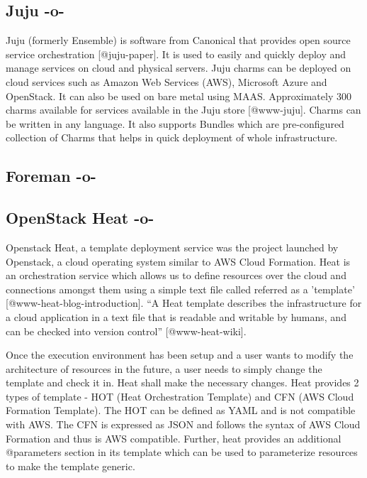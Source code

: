 \subsection{Juju -o-}

Juju (formerly Ensemble) is software from Canonical that provides open
source service orchestration [@juju-paper].  It is used to easily
and quickly deploy and manage services on cloud and physical
servers. Juju charms can be deployed on cloud services such as Amazon
Web Services (AWS), Microsoft Azure and OpenStack. It can also be used
on bare metal using MAAS.  Approximately 300 charms available for
services available in the Juju store [@www-juju]. Charms can be
written in any language. It also supports Bundles which are
pre-configured collection of Charms that helps in quick deployment of
whole infrastructure.



\subsection{Foreman -o-}



\subsection{OpenStack Heat -o-}

Openstack Heat, a template deployment service was the project launched
by Openstack, a cloud operating system similar to AWS Cloud
Formation. Heat is an orchestration service which allows us to define
resources over the cloud and connections amongst them using a simple
text file called referred as a
'template' [@www-heat-blog-introduction].  ``A Heat template
describes the infrastructure for a cloud application in a text file
that is readable and writable by humans, and can be checked into
version control'' [@www-heat-wiki].

Once the execution environment has been setup and a user wants to
modify the architecture of resources in the future, a user needs to
simply change the template and check it in. Heat shall make the
necessary changes. Heat provides 2 types of template - HOT (Heat
Orchestration Template) and CFN (AWS Cloud Formation Template). The
HOT can be defined as YAML and is not compatible with AWS. The CFN is
expressed as JSON and follows the syntax of AWS Cloud Formation and
thus is AWS compatible. Further, heat provides an additional
@parameters section in its template which can be used to parameterize
resources to make the template generic.



